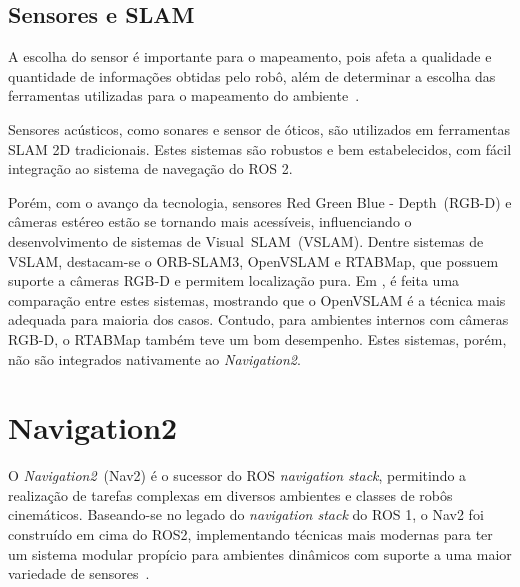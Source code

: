 \documentclass[repeatfields,xlists,xpacks,oneside,yearsonly]{ufrgscca}
\begin{document}
\subsection{Sensores e SLAM}

A escolha do sensor é importante para o mapeamento,
pois afeta a qualidade e quantidade de informações obtidas pelo robô, além
de determinar a escolha das ferramentas utilizadas para o mapeamento do
ambiente~\cite{SensorAndSLAM}.

Sensores acústicos, como sonares e sensor de óticos, são utilizados
em ferramentas SLAM 2D tradicionais. Estes sistemas são robustos e bem estabelecidos,
com fácil integração ao sistema de navegação do ROS 2.

Porém, com o avanço da tecnologia, sensores Red Green Blue - Depth~(RGB-D)
e câmeras estéreo estão se tornando mais acessíveis, influenciando o
desenvolvimento de sistemas de Visual~SLAM~(VSLAM).
Dentre sistemas de VSLAM, destacam-se o ORB-SLAM3, OpenVSLAM e RTABMap, que possuem suporte
a câmeras RGB-D e permitem localização pura.
Em \textcite{VSLAM}, é feita uma comparação entre estes sistemas, mostrando que o
OpenVSLAM é a técnica mais adequada para maioria dos casos.
Contudo, para ambientes internos com câmeras RGB-D, o RTABMap também teve um bom desempenho.
Estes sistemas, porém, não são integrados nativamente ao \textit{Navigation2}.


\section{Navigation2}

O \textit{Navigation2}~(Nav2) é o sucessor do ROS \textit{navigation stack}, permitindo
a realização de tarefas complexas em diversos ambientes e classes de robôs cinemáticos.
Baseando-se no legado do \textit{navigation stack} do ROS 1, o Nav2 foi construído em cima
do ROS2, implementando técnicas mais modernas para ter um sistema modular propício para
ambientes dinâmicos com suporte a uma maior variedade de sensores~\cite{Nav2}.
\end{document}
